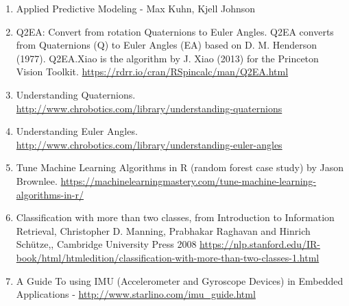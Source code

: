 \documentclass[]{article}
\begin{document}
\begin{enumerate}
\def\labelenumi{\arabic{enumi}.}
\item
  Applied Predictive Modeling - Max Kuhn, Kjell Johnson
\item
  Q2EA: Convert from rotation Quaternions to Euler Angles. Q2EA converts
  from Quaternions (Q) to Euler Angles (EA) based on D. M. Henderson
  (1977). Q2EA.Xiao is the algorithm by J. Xiao (2013) for the Princeton
  Vision Toolkit. \url{https://rdrr.io/cran/RSpincalc/man/Q2EA.html}
\item
  Understanding Quaternions.
  \url{http://www.chrobotics.com/library/understanding-quaternions}
\item
  Understanding Euler Angles.
  \url{http://www.chrobotics.com/library/understanding-euler-angles}
\item
  Tune Machine Learning Algorithms in R (random forest case study) by
  Jason Brownlee.
  \url{https://machinelearningmastery.com/tune-machine-learning-algorithms-in-r/}
\item
  Classification with more than two classes, from Introduction to
  Information Retrieval, Christopher D. Manning, Prabhakar Raghavan and
  Hinrich Schütze,, Cambridge University Press 2008
  \url{https://nlp.stanford.edu/IR-book/html/htmledition/classification-with-more-than-two-classes-1.html}
\item
  A Guide To using IMU (Accelerometer and Gyroscope Devices) in Embedded
  Applications - \url{http://www.starlino.com/imu_guide.html}
\end{enumerate}
\end{document}
